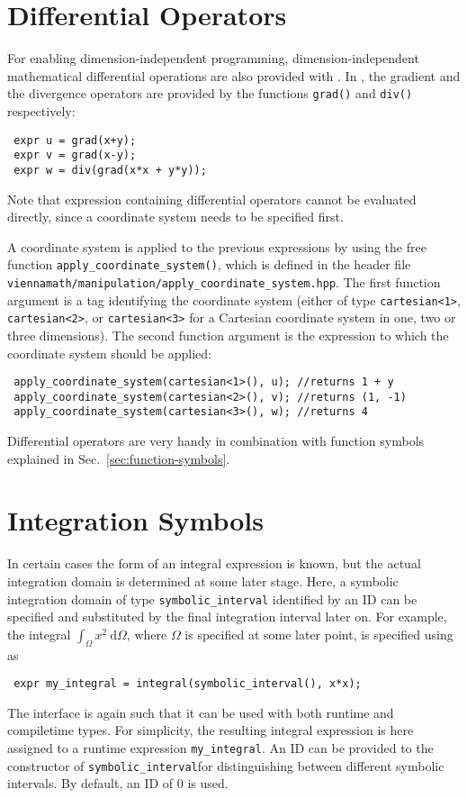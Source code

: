   \section{Differential Operators}
For enabling dimension-independent programming, dimension-independent mathematical differential operations are also provided with {\ViennaMath}.
In {\ViennaMathversion}, the gradient and the divergence operators are provided by the functions \lstinline|grad()| and \lstinline|div()| respectively:
\begin{lstlisting}
 expr u = grad(x+y);
 expr v = grad(x-y);
 expr w = div(grad(x*x + y*y));
\end{lstlisting}
Note that expression containing differential operators cannot be evaluated directly, since a coordinate system needs to be specified first.

A coordinate system is applied to the previous expressions by using the free function \lstinline|apply_coordinate_system()|, which is defined in the header file \lstinline|viennamath/manipulation/apply_coordinate_system.hpp|. The first function argument is a tag identifying the coordinate system (either of type \lstinline|cartesian<1>|, \lstinline|cartesian<2>|, or \lstinline|cartesian<3>| for a Cartesian coordinate system in one, two or three dimensions). The second function argument is the expression to which the coordinate system should be applied:
\begin{lstlisting}
 apply_coordinate_system(cartesian<1>(), u); //returns 1 + y
 apply_coordinate_system(cartesian<2>(), v); //returns (1, -1)
 apply_coordinate_system(cartesian<3>(), w); //returns 4
\end{lstlisting}
Differential operators are very handy in combination with function symbols explained in Sec.~\ref{sec:function-symbols}.

  \section{Integration Symbols}
In certain cases the form of an integral expression is known, but the actual integration domain is determined at some later stage. 
Here, a symbolic integration domain of type \lstinline|symbolic_interval| identified by an ID can be specified and substituted by the final integration interval later on.
For example, the integral $\int_\Omega x^2 \: \mathrm{d} \Omega$, where $\Omega$ is specified at some later point, is specified using {\ViennaMath} as
\begin{lstlisting}
 expr my_integral = integral(symbolic_interval(), x*x);
\end{lstlisting}
The interface is again such that it can be used with both runtime and compiletime types. For simplicity, the resulting integral expression is here assigned to a runtime expression \lstinline|my_integral|. An ID can be provided to the constructor of \lstinline|symbolic_interval|for distinguishing between different symbolic intervals. By default, an ID of $0$ is used.

